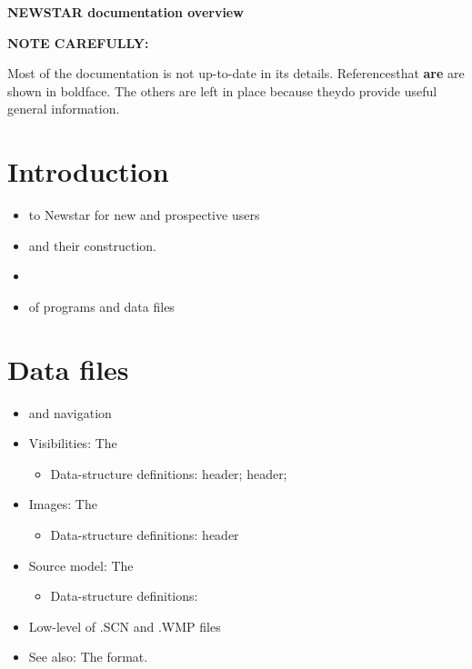 %
%
%
%
%



\newcommand{\bi}{\begin{itemize}}
\newcommand{\ei}{\end{itemize}}
\newcommand{\I}{\item}


{\bf NEWSTAR documentation overview}

        {\bf NOTE CAREFULLY: \em

        Most of the documentation is not up-to-date in its details.
Referencesthat {\bf are} are shown in boldface. The others are left in place
because theydo provide useful general information.}

\tableofcontents

\section{Introduction}
\bi
\I      {} to Newstar for new and
        prospective users
\I      {} and their construction. 
\I      {} 
\I      {} of programs
                and data files
\ei

\section{Data files}
\bi
\I      {} and navigation
\I      Visibilities: The 
  \bi
  \I    Data-structure definitions:
           header;
           header;
  \ei
\I      Images: The 
  \bi
  \I    Data-structure definitions:
           header
  \ei
\I      Source model: The 
  \bi
  \I    Data-structure definitions:
  \ei
\I      Low-level  of .SCN and .WMP
        files
\I      See also: The  format.
\ei

